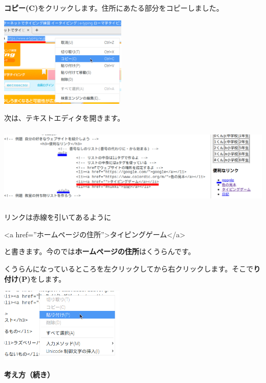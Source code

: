 \documentclass[a4paper,12pt]{jarticle}
\begin{document}
\textbf{コピー(C)}をクリックします。住所にあたる部分をコピーしました。

\centering
\includegraphics[width=6.064cm,height=4.311cm]{textbook-img197.png}

\bigskip
\flushleft

次は、テキストエディタを開きます。

\centering
\includegraphics[width=15.157cm,height=3.755cm]{textbook-img198.png}

\bigskip
\flushleft

リンクは赤線を引いてあるように

{\textless}a
href=”ホームページの住所”{\textgreater}タイピングゲーム{\textless}/a{\textgreater}

と書きます。今のでは\textbf{ホームページの住所}はくうらんです。

くうらんになっているところを左クリックしてから右クリックします。そこで\textbf{り付け(P)}をします。





\centering
\includegraphics[width=5.992cm,height=3.577cm]{textbook-img199.png}

\clearpage
\flushleft
\textbf{考え方（続き）}


\bigskip
\end{document}
